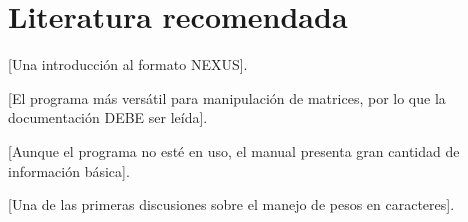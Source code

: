 \section*{Literatura recomendada} 

\cite{Maddison1997} [Una introducci\'on al formato NEXUS]. 

\cite{mesquite} [El programa m\'as vers\'atil para manipulaci\'on de matrices, por lo que la documentaci\'on DEBE ser le\'ida].

\cite{McClade4} [Aunque el programa no est\'e en uso, el manual presenta gran cantidad de informaci\'on b\'asica].

\cite{Neff1986} [Una de las primeras discusiones sobre el manejo de pesos en caracteres].
